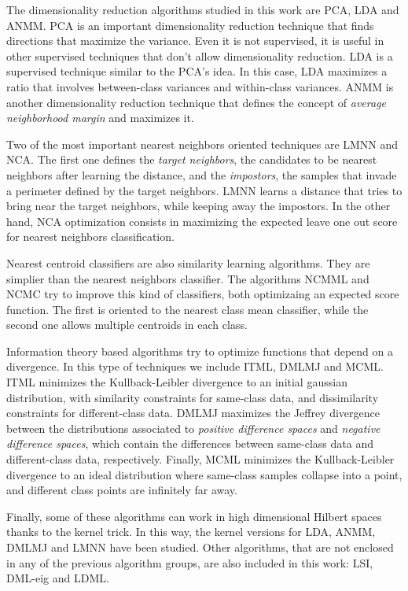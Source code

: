 The dimensionality reduction algorithms studied in this work are PCA, LDA and ANMM. PCA is an important dimensionality reduction technique that finds directions that maximize the variance. Even it is not supervised, it is useful in other supervised techniques that don't allow dimensionality reduction. LDA is a supervised technique similar to the PCA's idea. In this case, LDA maximizes a ratio that involves between-class variances and within-class variances. ANMM is another dimensionality reduction technique that defines the concept of \emph{average neighborhood margin} and maximizes it.

Two of the most important nearest neighbors oriented techniques are LMNN and NCA. The first one defines the \emph{target neighbors}, the candidates to be nearest neighbors after learning the distance, and the \emph{impostors}, the samples that invade a perimeter defined by the target neighbors. LMNN learns a distance that tries to bring near the target neighbors, while keeping away the impostors. In the other hand, NCA optimization consists in maximizing the expected leave one out score for nearest neighbors classification.

Nearest centroid classifiers are also similarity learning algorithms. They are simplier than the nearest neighbors classifier. The algorithms NCMML and NCMC try to improve this kind of classifiers, both optimizaing an expected score function. The first is oriented to the nearest class mean classifier, while the second one allows multiple centroids in each class.

Information theory based algorithms try to optimize functions that depend on a divergence. In this type of techniques we include ITML, DMLMJ and MCML. ITML minimizes the Kullback-Leibler divergence to an initial gaussian distribution, with similarity constraints for same-class data, and dissimilarity constraints for different-class data. DMLMJ maximizes the Jeffrey divergence between the distributions associated to \emph{positive difference spaces} and \emph{negative difference spaces}, which contain the differences between same-class data and different-class data, respectively. Finally, MCML minimizes the Kullback-Leibler divergence to an ideal distribution where same-class samples collapse into a point, and different class points are infinitely far away.

Finally, some of these algorithms can work in high dimensional Hilbert spaces thanks to the kernel trick. In this way, the kernel versions for LDA, ANMM, DMLMJ and LMNN have been studied. Other algorithms, that are not enclosed in any of the previous algorithm groups, are also included in this work: LSI, DML-eig and LDML.


